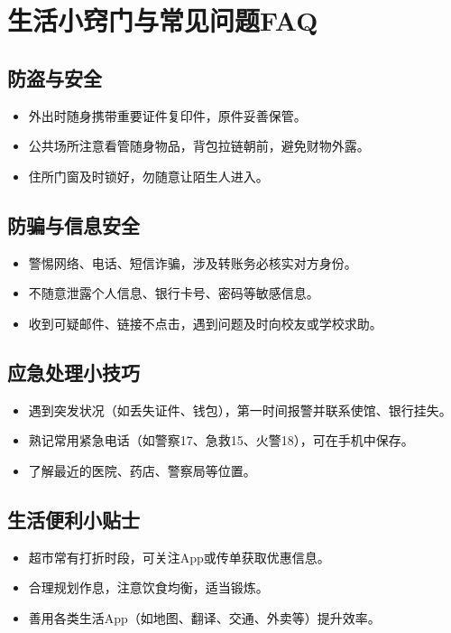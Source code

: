 \section{生活小窍门与常见问题FAQ}

\subsection{防盗与安全}
\begin{itemize}
    \item 外出时随身携带重要证件复印件，原件妥善保管。
    \item 公共场所注意看管随身物品，背包拉链朝前，避免财物外露。
    \item 住所门窗及时锁好，勿随意让陌生人进入。
\end{itemize}

\subsection{防骗与信息安全}
\begin{itemize}
    \item 警惕网络、电话、短信诈骗，涉及转账务必核实对方身份。
    \item 不随意泄露个人信息、银行卡号、密码等敏感信息。
    \item 收到可疑邮件、链接不点击，遇到问题及时向校友或学校求助。
\end{itemize}

\subsection{应急处理小技巧}
\begin{itemize}
    \item 遇到突发状况（如丢失证件、钱包），第一时间报警并联系使馆、银行挂失。
    \item 熟记常用紧急电话（如警察17、急救15、火警18），可在手机中保存。
    \item 了解最近的医院、药店、警察局等位置。
\end{itemize}

\subsection{生活便利小贴士}
\begin{itemize}
    \item 超市常有打折时段，可关注App或传单获取优惠信息。
    \item 合理规划作息，注意饮食均衡，适当锻炼。
    \item 善用各类生活App（如地图、翻译、交通、外卖等）提升效率。
\end{itemize}
